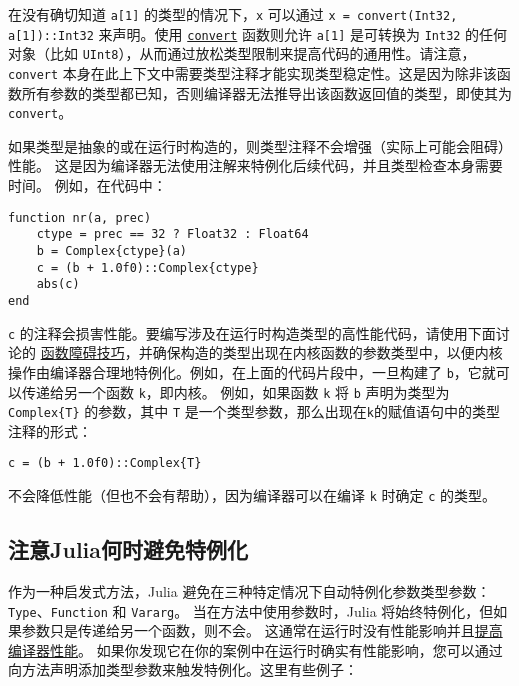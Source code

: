 在没有确切知道 \texttt{a[1]} 的类型的情况下，\texttt{x} 可以通过 \texttt{x = convert(Int32, a[1])::Int32} 来声明。使用 \hyperlink{1846942650946171605}{\texttt{convert}} 函数则允许 \texttt{a[1]} 是可转换为 \texttt{Int32} 的任何对象（比如 \texttt{UInt8}），从而通过放松类型限制来提高代码的通用性。请注意，\texttt{convert} 本身在此上下文中需要类型注释才能实现类型稳定性。这是因为除非该函数所有参数的类型都已知，否则编译器无法推导出该函数返回值的类型，即使其为 \texttt{convert}。



如果类型是抽象的或在运行时构造的，则类型注释不会增强（实际上可能会阻碍）性能。 这是因为编译器无法使用注解来特例化后续代码，并且类型检查本身需要时间。 例如，在代码中：




\begin{verbatim}
function nr(a, prec)
    ctype = prec == 32 ? Float32 : Float64
    b = Complex{ctype}(a)
    c = (b + 1.0f0)::Complex{ctype}
    abs(c)
end
\end{verbatim}



\texttt{c} 的注释会损害性能。要编写涉及在运行时构造类型的高性能代码，请使用下面讨论的 \hyperlink{17509985600836810807}{函数障碍技巧}，并确保构造的类型出现在内核函数的参数类型中，以便内核操作由编译器合理地特例化。例如，在上面的代码片段中，一旦构建了 \texttt{b}，它就可以传递给另一个函数 \texttt{k}，即内核。 例如，如果函数 \texttt{k} 将 \texttt{b} 声明为类型为 \texttt{Complex\{T\}} 的参数，其中 \texttt{T} 是一个类型参数，那么出现在\texttt{k}的赋值语句中的类型注释的形式：




\begin{verbatim}
c = (b + 1.0f0)::Complex{T}
\end{verbatim}



不会降低性能（但也不会有帮助），因为编译器可以在编译 \texttt{k} 时确定 \texttt{c} 的类型。



\hypertarget{13987935381679254535}{}


\subsection{注意Julia何时避免特例化}



作为一种启发式方法，Julia 避免在三种特定情况下自动特例化参数类型参数：\texttt{Type}、\texttt{Function} 和 \texttt{Vararg}。 当在方法中使用参数时，Julia 将始终特例化，但如果参数只是传递给另一个函数，则不会。 这通常在运行时没有性能影响并且\hyperlink{14494557220692677892}{提高编译器性能}。 如果你发现它在你的案例中在运行时确实有性能影响，您可以通过向方法声明添加类型参数来触发特例化。这里有些例子：



